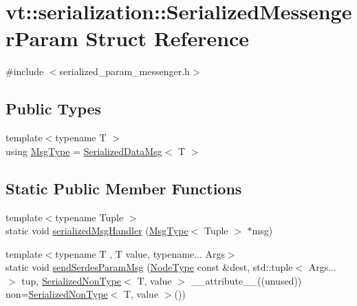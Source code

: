 \hypertarget{structvt_1_1serialization_1_1_serialized_messenger_param}{}\section{vt\+:\+:serialization\+:\+:Serialized\+Messenger\+Param Struct Reference}
\label{structvt_1_1serialization_1_1_serialized_messenger_param}


{\ttfamily \#include $<$serialized\+\_\+param\+\_\+messenger.\+h$>$}

\subsection*{Public Types}
\begin{DoxyCompactItemize}
\item 
{\footnotesize template$<$typename T $>$ }\\using \hyperlink{structvt_1_1serialization_1_1_serialized_messenger_param_af2ef71832c01ccb24597e82d032b37ab}{Msg\+Type} = \hyperlink{namespacevt_1_1serialization_a56d2aee859dc963c2b5fad82649dd79a}{Serialized\+Data\+Msg}$<$ T $>$
\end{DoxyCompactItemize}
\subsection*{Static Public Member Functions}
\begin{DoxyCompactItemize}
\item 
{\footnotesize template$<$typename Tuple $>$ }\\static void \hyperlink{structvt_1_1serialization_1_1_serialized_messenger_param_a0261b2a57c877a3027bb1eb4da6a5bbe}{serialized\+Msg\+Handler} (\hyperlink{structvt_1_1serialization_1_1_serialized_messenger_param_af2ef71832c01ccb24597e82d032b37ab}{Msg\+Type}$<$ Tuple $>$ $\ast$msg)
\item 
{\footnotesize template$<$typename T , T value, typename... Args$>$ }\\static void \hyperlink{structvt_1_1serialization_1_1_serialized_messenger_param_adc1797ad0b4fd3ee34ccdc1eb3fbe16f}{send\+Serdes\+Param\+Msg} (\hyperlink{namespacevt_a866da9d0efc19c0a1ce79e9e492f47e2}{Node\+Type} const \&dest, std\+::tuple$<$ Args... $>$ tup, \hyperlink{namespacevt_1_1serialization_a834e21f3294a160fc6545a1bfc3044af}{Serialized\+Non\+Type}$<$ T, value $>$ \+\_\+\+\_\+attribute\+\_\+\+\_\+((unused)) non=\hyperlink{namespacevt_1_1serialization_a834e21f3294a160fc6545a1bfc3044af}{Serialized\+Non\+Type}$<$ T, value $>$())
\end{DoxyCompactItemize}



